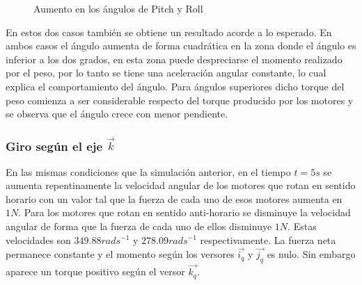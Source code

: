 \documentclass[main]{subfiles}
\begin{document}
\begin{figure} 
  \centering
  \caption{Aumento en los \'angulos de Pitch y Roll}
  \label{fig:giros}
\end{figure}

En estos dos casos tambi\'en se obtiene un resultado acorde a lo esperado. En ambos casos el \'angulo aumenta de forma cuadr\'atica en la zona donde el \'angulo es inferior a los dos grados, en esta zona puede despreciarse el momento realizado por el peso, por lo tanto se tiene una aceleraci\'on angular constante, lo cual explica el comportamiento del \'angulo. Para \'angulos superiores dicho torque del peso comienza a ser considerable respecto del torque producido por los motores y se observa que el \'angulo crece con menor pendiente.

\subsubsection{Giro seg\'un el eje $\vec{k}$}

En las mismas condiciones que la simulaci\'on anterior, en el tiempo $t=5s$ se aumenta repentinamente la velocidad angular de los motores que rotan en sentido horario con un valor tal que la fuerza de cada uno de esos motores aumenta en $1N$. Para los motores que rotan en sentido anti-horario se disminuye la velocidad angular de forma que la fuerza de cada uno de ellos disminuye $1N$. Estas velocidades son $349.88rads^{-1}$ y $278.09rads^{-1}$ respectivamente. La fuerza neta permanece constante y el momento seg\'un los versores $\vec{i_q}$ y $\vec{j_q} $ es nulo. Sin embargo aparece un torque positivo seg\'un el versor $\vec{k_q}$.\\
\end{document}
